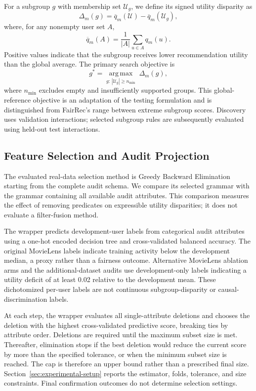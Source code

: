 \documentclass[sigconf,nonacm]{acmart}
\begin{document}
For a subgroup $g$ with membership set $\mathcal{U}_g$, we define its signed utility disparity as
\begin{equation}
\label{eq:utility-gap}
\Delta_m(g)=\overline{q}_m(\mathcal{U})-\overline{q}_m(\mathcal{U}_g),
\end{equation}
where, for any nonempty user set $A$,
\begin{equation}
\overline{q}_m(A)=\frac{1}{|A|}\sum_{u\in A}q_m(u).
\end{equation}
Positive values indicate that the subgroup receives lower recommendation utility than the global average. The primary search objective is
\begin{equation}
\label{eq:search-objective}
g^{*}=\underset{g:\,|\mathcal{U}_g|\geq n_{\min}}{\operatorname{arg\,max}}\;\Delta_m(g),
\end{equation}
where $n_{\min}$ excludes empty and insufficiently supported groups. This global-reference objective is an adaptation of the testing formulation and is distinguished from FairRec's range between extreme subgroup scores. Discovery uses validation interactions; selected subgroup rules are subsequently evaluated using held-out test interactions.

\subsection{Feature Selection and Audit Projection}
\label{sec:feature-selection}
The evaluated real-data selection method is Greedy Backward Elimination starting from the complete audit schema. We compare its selected grammar with the grammar containing all available audit attributes. This comparison measures the effect of removing predicates on expressible utility disparities; it does not evaluate a filter-fusion method.

The wrapper predicts development-user labels from categorical audit attributes using a one-hot encoded decision tree and cross-validated balanced accuracy. The original MovieLens labels indicate training activity below the development median, a proxy rather than a fairness outcome. Alternative MovieLens ablation arms and the additional-dataset audits use development-only labels indicating a utility deficit of at least 0.02 relative to the development mean. These dichotomized per-user labels are not continuous subgroup-disparity or causal-discrimination labels.

At each step, the wrapper evaluates all single-attribute deletions and chooses the deletion with the highest cross-validated predictive score, breaking ties by attribute order. Deletions are required until the maximum subset size is met. Thereafter, elimination stops if the best deletion would reduce the current score by more than the specified tolerance, or when the minimum subset size is reached. The cap is therefore an upper bound rather than a prescribed final size. Section~\ref{sec:experimental-setup} reports the estimator, folds, tolerance, and size constraints. Final confirmation outcomes do not determine selection settings.
\end{document}

